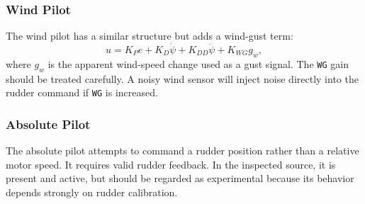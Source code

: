 \documentclass[10pt,twocolumn]{article}
\begin{document}
\subsubsection{Wind Pilot}
The wind pilot has a similar structure but adds a wind-gust term:
\[
u
=
K_P e
+
K_D \dot{\psi}
+
K_{DD} \ddot{\psi}
+
K_{WG} g_w ,
\]
where \(g_w\) is the apparent wind-speed change used as a gust signal.
The \texttt{WG} gain should be treated carefully.  A noisy wind sensor will
inject noise directly into the rudder command if \texttt{WG} is increased.
\subsubsection{Absolute Pilot}
The absolute pilot attempts to command a rudder position rather than a
relative motor speed.  It requires valid rudder feedback.  In the inspected
source, it is present and active, but should be regarded as experimental
because its behavior depends strongly on rudder calibration.
\end{document}
